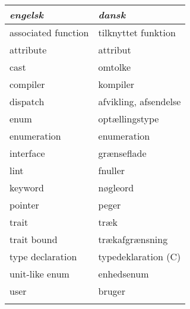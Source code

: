 \documentclass{article}
\begin{document}
\begin{longtable}{l|l}
\emph{engelsk} & \emph{dansk}\\\hline
associated function & tilknyttet funktion \\
attribute & attribut \\
cast & omtolke \\
compiler & kompiler \\
dispatch & afvikling, afsendelse \\
enum & optællingstype \\
enumeration & enumeration \\
interface & grænseflade \\
lint & fnuller \\
keyword & nøgleord \\
pointer & peger \\
trait & træk \\
trait bound & trækafgrænsning \\
type declaration & typedeklaration (C) \\
unit-like enum & enhedsenum \\
user & bruger \\
\label{tab:ordbog}
\end{longtable}
\end{document}
